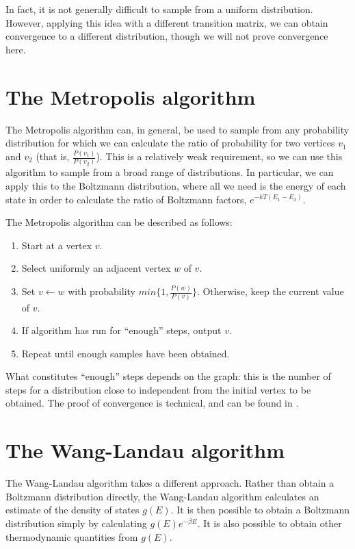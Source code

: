 \documentclass{article}
\begin{document}
In fact, it is not generally difficult to sample from a uniform distribution.
However, applying this idea with a different transition matrix, we can obtain convergence to a different distribution, though we will not prove convergence here.

\section{The Metropolis algorithm}
The Metropolis algorithm can, in general, be used to sample from any probability distribution for which we can calculate the ratio of probability for two vertices $v_1$ and $v_2$ (that is, $\frac{P(v_1)}{P(v_2)}$).
This is a relatively weak requirement, so we can use this algorithm to sample from a broad range of distributions.
In particular, we can apply this to the Boltzmann distribution, where all we need is the energy of each state in order to calculate the ratio of Boltzmann factors, $e^{-kT(E_1-E_2)}$.

The Metropolis algorithm can be described as follows:
\begin{enumerate}
    \item Start at a vertex $v$.
    \item Select uniformly an adjacent vertex $w$ of $v$.
    \item Set $v \leftarrow w$ with probability $min\{1, \frac{P(w)}{P(v)}\}$. Otherwise, keep the current value of $v$.
    \item If algorithm has run for ``enough'' steps, output $v$.
    \item Repeat until enough samples have been obtained.
\end{enumerate}

What constitutes ``enough'' steps depends on the graph: this is the number of steps for a distribution close to independent from the initial vertex to be obtained.
The proof of convergence is technical, and can be found in . %

\section{The Wang-Landau algorithm}
The Wang-Landau algorithm takes a different approach.
Rather than obtain a Boltzmann distribution directly, the Wang-Landau algorithm calculates an estimate of the density of states $g(E)$.
It is then possible to obtain a Boltzmann distribution simply by calculating $g(E)e^{-\beta E}$.
It is also possible to obtain other thermodynamic quantities from $g(E)$.
\end{document}
